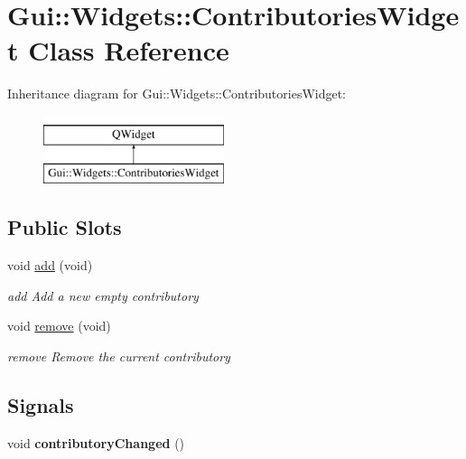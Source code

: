 \hypertarget{classGui_1_1Widgets_1_1ContributoriesWidget}{\section{Gui\-:\-:Widgets\-:\-:Contributories\-Widget Class Reference}
\label{classGui_1_1Widgets_1_1ContributoriesWidget}
}
Inheritance diagram for Gui\-:\-:Widgets\-:\-:Contributories\-Widget\-:\begin{figure}[H]
\begin{center}
\leavevmode
\includegraphics[height=2.000000cm]{dc/da3/classGui_1_1Widgets_1_1ContributoriesWidget}
\end{center}
\end{figure}
\subsection*{Public Slots}
\begin{DoxyCompactItemize}
\item 
\hypertarget{classGui_1_1Widgets_1_1ContributoriesWidget_a756c0d1076fad1a3805975343e66a1de}{void \hyperlink{classGui_1_1Widgets_1_1ContributoriesWidget_a756c0d1076fad1a3805975343e66a1de}{add} (void)}\label{classGui_1_1Widgets_1_1ContributoriesWidget_a756c0d1076fad1a3805975343e66a1de}

\begin{DoxyCompactList}\small\item\em add Add a new empty contributory \end{DoxyCompactList}\item 
\hypertarget{classGui_1_1Widgets_1_1ContributoriesWidget_a35895ad0b9c497263f633680288b414e}{void \hyperlink{classGui_1_1Widgets_1_1ContributoriesWidget_a35895ad0b9c497263f633680288b414e}{remove} (void)}\label{classGui_1_1Widgets_1_1ContributoriesWidget_a35895ad0b9c497263f633680288b414e}

\begin{DoxyCompactList}\small\item\em remove Remove the current contributory \end{DoxyCompactList}\end{DoxyCompactItemize}
\subsection*{Signals}
\begin{DoxyCompactItemize}
\item 
\hypertarget{classGui_1_1Widgets_1_1ContributoriesWidget_a510bfd755cf271fd10b63cf68284cd02}{void {\bfseries contributory\-Changed} ()}\label{classGui_1_1Widgets_1_1ContributoriesWidget_a510bfd755cf271fd10b63cf68284cd02}

\end{DoxyCompactItemize}
